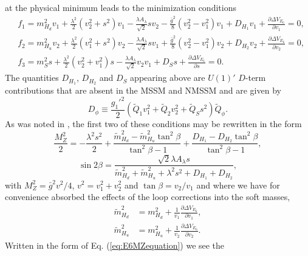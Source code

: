 \documentclass[preprint,amsmath,amssymb,aps,superscriptaddress,prd,showpacs,floatfix,nofootinbib]{revtex4-1}
\begin{document}
at the physical minimum leads to the minimization conditions
\begin{subequations}\label{eq:E6EWSBConditions}
\begin{align}
&f_1=m_{H_d}^2v_1+\frac{\lambda^2}{2}(v_2^2+s^2)v_1-\frac{\lambda A_\lambda}{\sqrt{2}}sv_2-\frac{\bar{g}^2}{8}
(v_2^2-v_1^2)v_1+D_{H_1}v_1+\frac{\partial \Delta V_{E_6}}{\partial v_1}=0,\label{eq:E6EWSBcondition1} \\
&f_2=m_{H_u}^2v_2+\frac{\lambda^2}{2}(v_1^2+s^2)v_2-\frac{\lambda A_\lambda}{\sqrt{2}}sv_1+\frac{\bar{g}^2}{8}
(v_2^2-v_1^2)v_2+D_{H_2}v_2+\frac{\partial \Delta V_{E_6}}{\partial v_2}=0,\label{eq:E6EWSBcondition2} \\
&f_3=m_S^2s+\frac{\lambda^2}{2}(v_2^2+v_1^2)s-\frac{\lambda A_\lambda}{\sqrt{2}}v_2v_1+D_Ss+\frac{\partial \Delta V_{E_6}}{\partial s}=0.\label{eq:E6EWSBcondition3}
\end{align}
\end{subequations}
The quantities $D_{H_1}$, $D_{H_2}$ and $D_S$ appearing above are
$U(1)'$ $D$-term contributions that are absent in the MSSM and NMSSM
and are given by
\begin{equation}\label{eq:E6Dterms}
D_\phi\equiv \frac{g_1'^2}{2}\left (
\tilde{Q}_1v_1^2+\tilde{Q}_2v_2^2+\tilde{Q}_Ss^2\right
)\tilde{Q}_\phi.
\end{equation}
As was noted in \cite{Athron:2013ipa}, the first two of these
conditions may be rewritten in the form
\begin{equation}\label{eq:E6MZequation}
\frac{M_Z^2}{2}=-\frac{\lambda^2s^2}{2}+\frac{\tilde{m}_{H_d}^2-\tilde{m}_{H_u}^2\tan^2\beta}{\tan^2\beta-1}+\frac{D_{H_1}-D_{H_2}\tan^2\beta}{\tan^2\beta-1},
\end{equation}
\begin{equation}\label{eq:E6sin2bequation}
\sin 2\beta=\frac{\sqrt{2}\lambda A_{\lambda} s}{\tilde{m}_{H_d}^2+\tilde{m}_{H_u}^2+\lambda^2s^2+D_{H_1}+D_{H_2}},
\end{equation}
with $M_Z^2=\bar{g}^2v^2/4$, $v^2=v_1^2+v_2^2$ and $\tan\beta =
v_2/v_1$ and where we have for convenience absorbed the effects of the
loop corrections into the soft masses,
\begin{align*}
\tilde{m}_{H_d}^2&=m_{H_d}^2+\frac{1}{v_1}\frac{\partial \Delta
  V_{E_6}}{\partial
  v_1},\\ \tilde{m}_{H_u}^2&=m_{H_u}^2+\frac{1}{v_2}\frac{\partial
  \Delta V_{E_6}}{\partial v_2}.
\end{align*}
Written in the form of Eq. (\ref{eq:E6MZequation}) we see the
\end{document}
